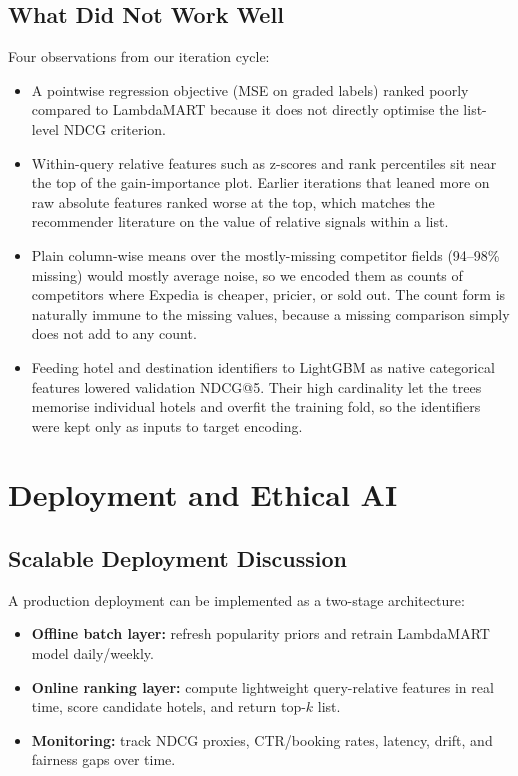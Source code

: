 \documentclass{llncs}
\begin{document}
\subsection{What Did Not Work Well}
Four observations from our iteration cycle:
\begin{itemize}
\item A pointwise regression objective (MSE on graded labels) ranked poorly compared to LambdaMART because it does not directly optimise the list-level NDCG criterion.
\item Within-query relative features such as z-scores and rank percentiles sit near the top of the gain-importance plot. Earlier iterations that leaned more on raw absolute features ranked worse at the top, which matches the recommender literature on the value of relative signals within a list.
\item Plain column-wise means over the mostly-missing competitor fields (94--98\% missing) would mostly average noise, so we encoded them as counts of competitors where Expedia is cheaper, pricier, or sold out. The count form is naturally immune to the missing values, because a missing comparison simply does not add to any count.
\item Feeding hotel and destination identifiers to LightGBM as native categorical features lowered validation NDCG@5. Their high cardinality let the trees memorise individual hotels and overfit the training fold, so the identifiers were kept only as inputs to target encoding.
\end{itemize}

\section{Deployment and Ethical AI}
\label{sec:deploy}

\subsection{Scalable Deployment Discussion}
A production deployment can be implemented as a two-stage architecture:
\begin{itemize}
\item \textbf{Offline batch layer:} refresh popularity priors and retrain LambdaMART model daily/weekly.
\item \textbf{Online ranking layer:} compute lightweight query-relative features in real time, score candidate hotels, and return top-$k$ list.
\item \textbf{Monitoring:} track NDCG proxies, CTR/booking rates, latency, drift, and fairness gaps over time.
\end{itemize}
\end{document}
